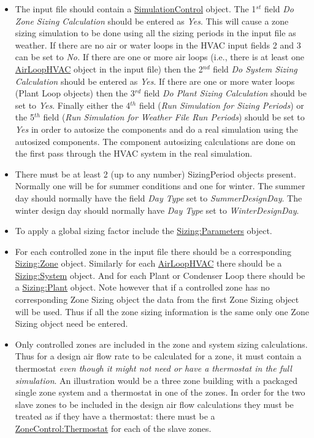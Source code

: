 \begin{itemize}
\item
  The input file should contain a \hyperref[simulationcontrol]{SimulationControl} object. The 1\(^{st}\) field \emph{Do Zone Sizing Calculation} should be entered as \emph{Yes}. This will cause a zone sizing simulation to be done using all the sizing periods in the input file as weather. If there are no air or water loops in the HVAC input fields 2 and 3 can be set to \emph{No.} If there are one or more air loops (i.e., there is at least one \hyperref[airloophvac]{AirLoopHVAC} object in the input file) then the 2\(^{nd}\) field \emph{Do System Sizing Calculation} should be entered as \emph{Yes}. If there are one or more water loops (Plant Loop objects) then the 3\(^{rd}\) field \emph{Do Plant Sizing Calculation} should be set to \emph{Yes}. Finally either the 4\(^{th}\) field (\emph{Run Simulation for Sizing Periods}) or the 5\(^{th}\) field (\emph{Run Simulation for Weather File Run Periods}) should be set to \emph{Yes} in order to autosize the components and do a real simulation using the autosized components. The component autosizing calculations are done on the first pass through the HVAC system in the real simulation.
\item
  There must be at least 2 (up to any number) SizingPeriod objects present. Normally one will be for summer conditions and one for winter. The summer day should normally have the field \emph{Day Type} set to \emph{SummerDesignDay}. The winter design day should normally have \emph{Day Type} set to \emph{WinterDesignDay}.
\item
  To apply a global sizing factor include the \hyperref[sizingparameters]{Sizing:Parameters} object.
\item
  For each controlled zone in the input file there should be a corresponding \hyperref[sizingzone]{Sizing:Zone} object. Similarly for each \hyperref[airloophvac]{AirLoopHVAC} there should be a \hyperref[sizingsystem]{Sizing:System} object. And for each Plant or Condenser Loop there should be a \hyperref[sizingplant]{Sizing:Plant} object. Note however that if a controlled zone has no corresponding Zone Sizing object the data from the first Zone Sizing object will be used. Thus if all the zone sizing information is the same only one Zone Sizing object need be entered.
\item
  Only controlled zones are included in the zone and system sizing calculations. Thus for a design air flow rate to be calculated for a zone, it must contain a thermostat \emph{even though it might not need or have a thermostat in the full simulation}. An illustration would be a three zone building with a packaged single zone system and a thermostat in one of the zones. In order for the two slave zones to be included in the design air flow calculations they must be treated as if they have a thermostat: there must be a \hyperref[zonecontrolthermostat]{ZoneControl:Thermostat} for each of the slave zones.

\end{itemize}
